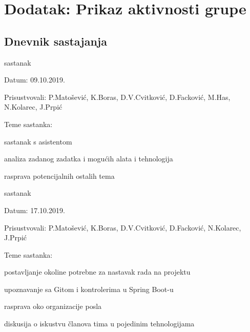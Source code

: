 \chapter*{Dodatak: Prikaz aktivnosti grupe}
		
		\section*{Dnevnik sastajanja}
		
%		
%		
		
		\begin{packed_enum}
			\item sastanak
			\item[] \begin{packed_item}
				\item Datum: 09.10.2019.
				\item Prisustvovali: P.Matošević, K.Boras, D.V.Cvitković, D.Facković, M.Has, N.Kolarec, J.Prpić
				\item Teme sastanka:
				\begin{packed_item}
					\item  sastanak s asistentom
					\item  analiza zadanog zadatka i mogućih alata i tehnologija
					\item  rasprava potencijalnih ostalih tema
				\end{packed_item}
			\end{packed_item}
		
		\item sastanak
		\item[] \begin{packed_item}
			\item Datum: 17.10.2019.
			\item Prisustvovali: P.Matošević, K.Boras, D.V.Cvitković, D.Facković, N.Kolarec, J.Prpić
			\item Teme sastanka:
			\begin{packed_item}
				\item  postavljanje okoline potrebne za nastavak rada na projektu
				\item  upoznavanje sa Gitom i kontrolerima u Spring Boot-u
				\item  rasprava oko organizacije posla
				\item  diskusija o iskustvu članova tima u pojedinim tehnologijama
			\end{packed_item}
		\end{packed_item}
	

\end{packed_enum}

